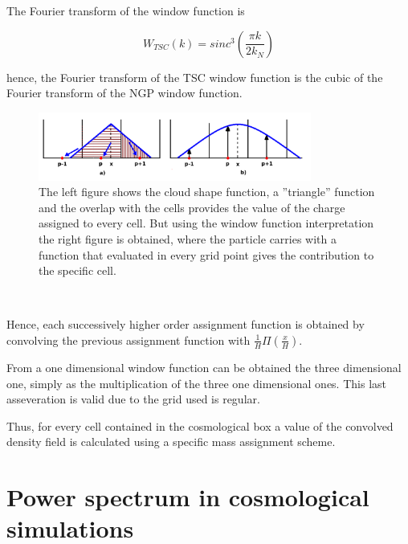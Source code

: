 The Fourier transform of the window function is 

\[ W_{TSC}(k)= sinc^3\left(\frac{\pi k}{2k_N} \right)\]

hence, the Fourier transform of the TSC window function is the cubic of the Fourier 
transform of the NGP window function. 

\begin{figure}[htbp]
       \centering
               \includegraphics[width=0.8\textwidth]{Images/chapter3/TSC.png}
       \caption{\small The left figure shows the cloud shape function, a ''triangle'' function
       and the overlap with the cells provides the value of the charge assigned to every cell. But
       using the window function interpretation the right figure is obtained, where the particle carries
       with a function that evaluated in every grid point gives the contribution to the specific cell. }
       \label{TSC}
 \end{figure}

\

Hence, each successively higher order assignment function is obtained by convolving the previous
assignment function with $\frac{1}{H}\Pi\left(\frac{x}{H}\right)$. 

From a one dimensional window function can be obtained the three dimensional one, simply as
the multiplication of the three one dimensional ones. This last asseveration is valid due to 
the grid used is regular. 

Thus, for every cell contained in the cosmological box a value of the convolved density 
field is calculated using a specific mass assignment scheme. 

\section{ Power spectrum in cosmological simulations }


